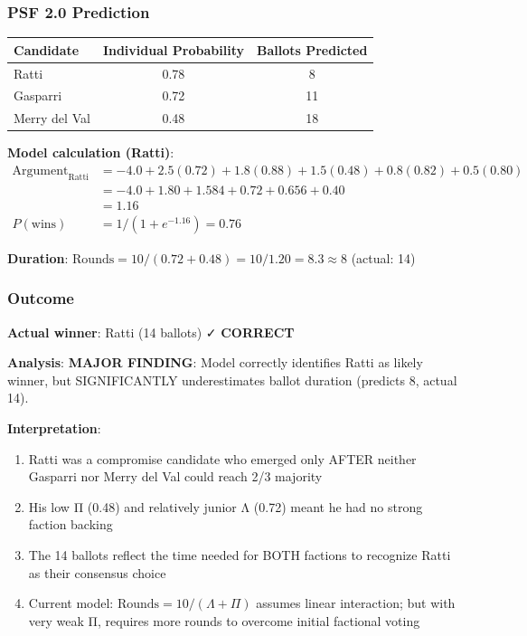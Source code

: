 \documentclass[11pt,a4paper]{article}
\begin{document}
\subsubsection{PSF 2.0 Prediction}

\begin{center}
\begin{tabular}{lcc}
\toprule
\textbf{Candidate} & \textbf{Individual Probability} & \textbf{Ballots Predicted} \\
\midrule
Ratti & 0.78 & 8 \\
Gasparri & 0.72 & 11 \\
Merry del Val & 0.48 & 18 \\
\bottomrule
\end{tabular}
\end{center}

\textbf{Model calculation (Ratti)}:
\begin{equation}
\begin{split}
\text{Argument}_{\text{Ratti}} &= -4.0 + 2.5(0.72) + 1.8(0.88) + 1.5(0.48) + 0.8(0.82) + 0.5(0.80) \\
&= -4.0 + 1.80 + 1.584 + 0.72 + 0.656 + 0.40 \\
&= 1.16 \\
P(\text{wins}) &= 1 / (1 + e^{-1.16}) = 0.76
\end{split}
\end{equation}

\textbf{Duration}: $\text{Rounds} = 10 / (0.72 + 0.48) = 10 / 1.20 = 8.3 \approx 8$ (actual: 14)

\subsubsection{Outcome}

\textbf{Actual winner}: Ratti (14 ballots) ✓ \textbf{CORRECT}

\textbf{Analysis}: \textbf{MAJOR FINDING}: Model correctly identifies Ratti as likely winner, but SIGNIFICANTLY underestimates ballot duration (predicts 8, actual 14).

\textbf{Interpretation}:
\begin{enumerate}
    \item Ratti was a compromise candidate who emerged only AFTER neither Gasparri nor Merry del Val could reach 2/3 majority
    \item His low Π (0.48) and relatively junior Λ (0.72) meant he had no strong faction backing
    \item The 14 ballots reflect the time needed for BOTH factions to recognize Ratti as their consensus choice
    \item Current model: $\text{Rounds} = 10/(\Lambda + \Pi)$ assumes linear interaction; but with very weak Π, requires more rounds to overcome initial factional voting
\end{enumerate}
\end{document}
